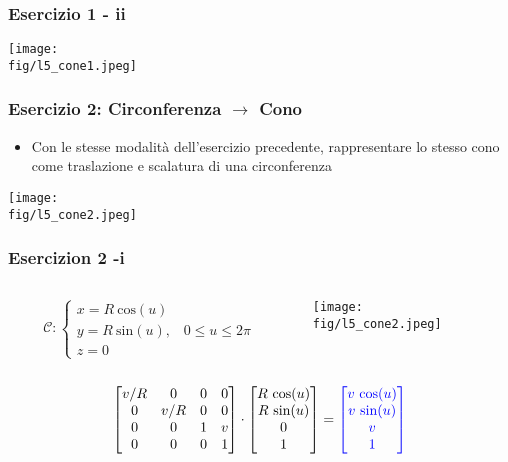 \documentclass{beamer}
\newcommand{\fig}{./figures} %
\newcommand{\msin}{\mbox{sin}} %
\newcommand{\mcos}{\mbox{cos}} %
\begin{document}
\begin{frame}
\frametitle{Esercizio 1 - ii}
\begin{center}
\texttt{[image: \\fig/l5\_cone1.jpeg]}
\end{center}
\end{frame}
\begin{frame}
\frametitle{Esercizio 2: Circonferenza $\rightarrow$ Cono}
\begin{itemize}
\item Con le stesse modalit\`a dell'esercizio precedente, rappresentare lo stesso cono come traslazione e scalatura di una circonferenza
\end{itemize}
\begin{center}
\texttt{[image: \\fig/l5\_cone2.jpeg]}
\end{center}
\end{frame}
%
\begin{frame}
\frametitle{Esercizion 2 -i }
\begin{columns}
\begin{column}{0.58\textwidth}
\begin{displaymath}
\mathcal{C}:
\begin{cases}
x = R~\mcos(u)\\
y = R~\msin(u), \;\;\;0\le u\le 2\pi\\
z = 0
\end{cases}
\end{displaymath}
\end{column}
\begin{column}{0.39\textwidth}
\texttt{[image: \\fig/l5\_cone2.jpeg]}

\end{column}
\end{columns}
%
\vspace{0.1\textheight}
\begin{displaymath}
\begin{bmatrix}
v/R & 0 & 0 & 0\\
0 & v/R & 0 & 0\\
0 & 0   & 1 & v\\
0 & 0   & 0 & 1
\end{bmatrix}
\cdot
\begin{bmatrix}
R~\mcos(u)\\
R~\msin(u)\\
0\\
1
\end{bmatrix}
= 
{\color{blue}
\begin{bmatrix}
v ~\mcos(u)\\
v ~\msin(u)\\
v\\
1
\end{bmatrix}
}
\end{displaymath}
\end{frame}
\end{document}
